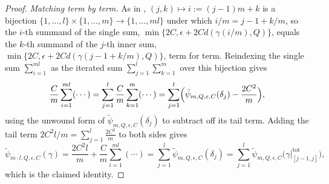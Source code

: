 \begin{proof}
  \emph{Matching term by term.} As in , $(j,k)\mapsto i:=(j-1)m+k$ is a
  bijection $\{1,\dotsc,l\}\times\{1,\dotsc,m\} \to \{1,\dotsc,ml\}$ under which $i/m = j-1+k/m$, so
  the $i$-th summand of the single sum, $\min\{2C,\epsilon+2Cd(\gamma(i/m),Q)\}$, equals the $k$-th
  summand of the $j$-th inner sum, $\min\{2C,\epsilon+2Cd(\gamma(j-1+k/m),Q)\}$, term for term.
  Reindexing the single sum $\sum_{i=1}^{ml}$ as the iterated sum $\sum_{j=1}^l\sum_{k=1}^m$ over
  this bijection gives
  \[
    \frac{C}{m}\sum_{i=1}^{ml}(\cdots) = \sum_{j=1}^l \frac{C}{m}\sum_{k=1}^m(\cdots)
    = \sum_{j=1}^l \Bigl(\tilde\psi_{m,Q,\epsilon,C}(\delta_j) - \frac{2C^2}{m}\Bigr)
    ,
  \]
  using the unwound form of $\tilde\psi_{m,Q,\epsilon,C}(\delta_j)$ to subtract off its tail term.
  Adding the tail term $2C^2l/m = \sum_{j=1}^l \tfrac{2C^2}{m}$ to both sides gives
  \[
    \tilde\psi_{m\cdot l,Q,\epsilon,C}(\gamma) = \frac{2C^2l}{m} +
      \frac{C}{m}\sum_{i=1}^{ml}(\cdots)
    = \sum_{j=1}^l \tilde\psi_{m,Q,\epsilon,C}(\delta_j)
    = \sum_{j=1}^l \tilde\psi_{m,Q,\epsilon,C}\bigl(\gamma|^{\mathrm{tot}}_{[j-1,j]}\bigr)
    ,
  \]
  which is the claimed identity.
\end{proof}

